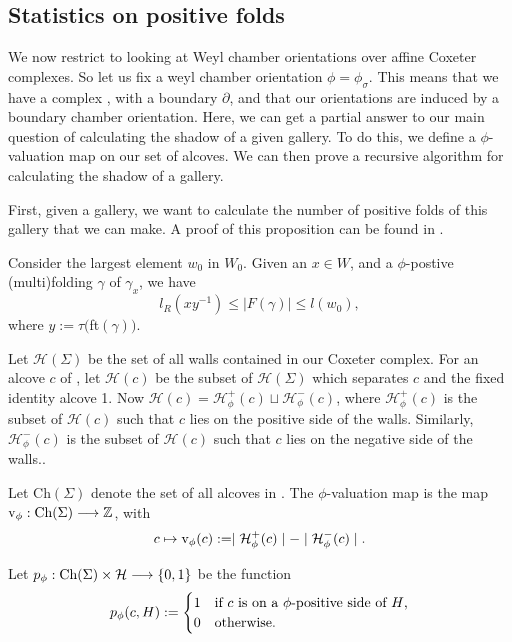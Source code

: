 \documentclass[11pt]{article}
\begin{document}
\subsection{Statistics on positive folds}

We now restrict to looking at Weyl chamber orientations over affine Coxeter complexes. So let us fix a weyl chamber orientation $\phi=\phi_\sigma$. This means that we have a complex \sg, with a boundary $\partial$\sg, and that our orientations are induced by a boundary chamber orientation. Here, we can get a partial answer to our main question of calculating the shadow of a given gallery. To do this, we define a $\phi$-valuation map on our set of alcoves. We can then prove a recursive algorithm for calculating the shadow of a gallery.

First, given a gallery, we want to calculate the number of positive folds of this gallery that we can make. A proof of this proposition can be found in \cite{DEL}.

\begin{proposition}
    Consider the largest element $w_0$ in $W_0$. Given an $x\in W$, and a $\phi$-postive (multi)folding $\gamma$ of $\gamma_x$, we have
    \[l_R(xy^{-1})\leq \mid F(\gamma)\mid \leq l(w_0),\]
    where $y:=\tau($ft$(\gamma))$.
\end{proposition}


\begin{definition}
    Let $\mathcal{H}(\Sigma)$ be the set of all walls contained in our Coxeter complex. For an alcove $c$ of \sg, let $\mathcal{H}(c)$ be the subset of $\mathcal{H}(\Sigma)$ which separates $c$ and the fixed identity alcove 1. Now $\mathcal{H}(c)=\mathcal{H}_{\phi}^+(c)\sqcup \mathcal{H}_{\phi}^-(c)$, where $\mathcal{H}_{\phi}^+(c)$ is the subset of $\mathcal{H}(c)$ such that $c$ lies on the positive side of the walls. Similarly, $\mathcal{H}_{\phi}^-(c)$ is the subset of $\mathcal{H}(c)$ such that $c$ lies on the negative side of the walls..
\end{definition}


\begin{definition}
    Let Ch$(\Sigma)$ denote the set of all alcoves in \sg. The $\phi$-valuation map is the map $\textnormal{v}_\phi:\textnormal{Ch}(\Sigma)\longrightarrow\mathbb{Z}$, with
    \[c\mapsto \textnormal{v}_\phi(c):= \mid \mathcal{H}_{\phi}^+(c)\mid -\mid \mathcal{H}_{\phi}^-(c)\mid .\]
\end{definition}

\begin{definition}
    Let $p_\phi : \textnormal{Ch}(\Sigma)\times \mathcal{H}\longrightarrow \{0,1\}$ be the function 
    \[p_\phi(c,H):= \begin{cases}
        1 & \textnormal{if $c$ is on a $\phi$-positive side of $H$,}\\
        0 & \textnormal{otherwise.}
    \end{cases}\]
\end{definition}
\end{document}
